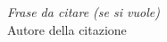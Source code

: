 \begin{titlepage}

\nonumber
\null {}
	\begin{flushright}
\textit{Frase da citare (se si vuole)} \\[5mm]
	Autore della citazione
	\end{flushright}
\null

\end{titlepage}
\cleardoublepage